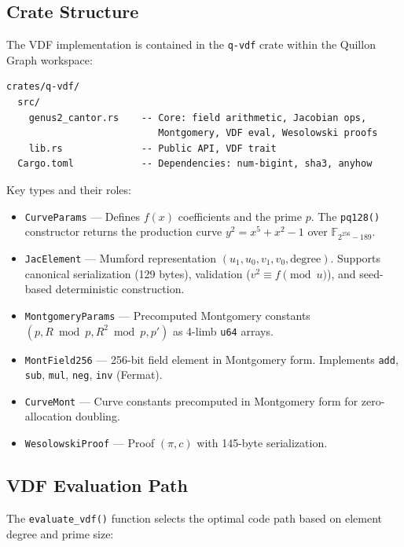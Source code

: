 \documentclass[11pt,a4paper]{article}
\begin{document}
\subsection{Crate Structure}

The VDF implementation is contained in the \texttt{q-vdf} crate within the Quillon Graph workspace:

\begin{lstlisting}[language={},frame=single,basicstyle=\ttfamily\footnotesize]
crates/q-vdf/
  src/
    genus2_cantor.rs    -- Core: field arithmetic, Jacobian ops,
                           Montgomery, VDF eval, Wesolowski proofs
    lib.rs              -- Public API, VDF trait
  Cargo.toml            -- Dependencies: num-bigint, sha3, anyhow
\end{lstlisting}

Key types and their roles:

\begin{itemize}
    \item \texttt{CurveParams} --- Defines $f(x)$ coefficients and the prime $p$. The \texttt{pq128()} constructor returns the production curve $y^2 = x^5 + x^2 - 1$ over $\mathbb{F}_{2^{256}-189}$.
    \item \texttt{JacElement} --- Mumford representation $(u_1, u_0, v_1, v_0, \mathrm{degree})$. Supports canonical serialization (129 bytes), validation ($v^2 \equiv f \pmod{u}$), and seed-based deterministic construction.
    \item \texttt{MontgomeryParams} --- Precomputed Montgomery constants $(p, R \bmod p, R^2 \bmod p, p')$ as 4-limb \texttt{u64} arrays.
    \item \texttt{MontField256} --- 256-bit field element in Montgomery form. Implements \texttt{add}, \texttt{sub}, \texttt{mul}, \texttt{neg}, \texttt{inv} (Fermat).
    \item \texttt{CurveMont} --- Curve constants precomputed in Montgomery form for zero-allocation doubling.
    \item \texttt{WesolowskiProof} --- Proof $(\pi, c)$ with 145-byte serialization.
\end{itemize}

\subsection{VDF Evaluation Path}

The \texttt{evaluate\_vdf()} function selects the optimal code path based on element degree and prime size:
\end{document}
